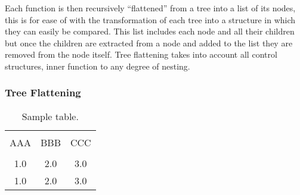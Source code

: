 \documentclass[jou,apacite]{apa6}
\begin{document}
Each function is then recursively “flattened” from a tree into a list of its nodes, this is for ease of with the transformation of each tree into a structure in which they can easily be compared. This list includes each node and all their children but once the children are extracted from a node and added to the list they are removed from the node itself. Tree flattening takes into account all control structures, inner function to any degree of nesting. 

\subsubsection{Tree Flattening}


\begin{table}[!htb]
\caption{Sample table.}\label{tab1}
\begin{tabular}{ccc}
\hline\\[-1.5ex]
AAA & BBB & CCC \\[0.5ex]
\hline\\[-1.5ex]
1.0 & 2.0 & 3.0\\[0.5ex]
1.0 & 2.0 & 3.0\\[0.5ex]
\hline
\end{tabular}
\end{table}



\end{document}
